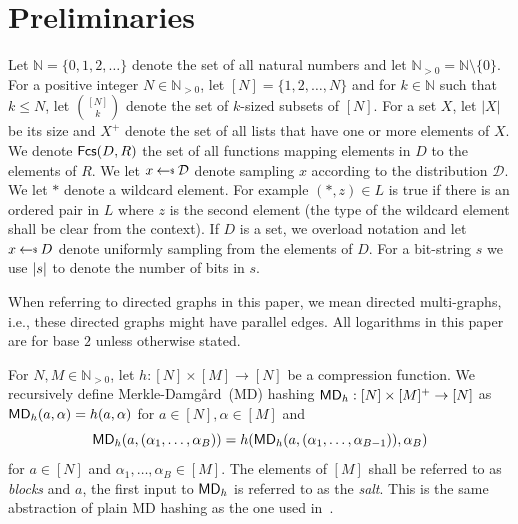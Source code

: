 \section{Preliminaries}\label{sec:prelims}
\ifnum{} Let $\mathbb{N}=\{0,1,2,\ldots\}$ denote the set of all natural numbers and let $\mathbb{N}_{>0}=\mathbb{N}\setminus\{0\}$. \fi
For \ifnum{} a positive integer \fi $N\in \mathbb{N}_{>0}$, let $[N]=\{1,2,\ldots,N\}$ and for $k\in \mathbb{N}$ such that $k\leq N$, let $\binom{[N]}{k}$ denote the set of $k$-sized subsets of $[N]$. For a set $X$, let $|X|$ be its size and $X^+$ denote the set of all lists that have one or more elements of $X$. We denote $\mathsf{Fcs}(D,R)$  the set of all functions mapping elements in $D$ to the elements of $R$.
%
We let $x\getsr\mathcal{D}$ denote sampling $x$ according to the distribution $\mathcal{D}$. We let $\ast$ denote a wildcard element. For example $(\ast,z)\in L$ is true if there is an ordered pair in $L$ where $z$ is the second element (the type of the wildcard element shall be clear from the context).
If $D$ is a set, we overload notation and let $x\getsr D$ denote uniformly sampling from the elements of $D$. For a bit-string $s$ we use $\left| s \right|$ to denote the number of bits in $s$.

When referring to directed graphs in this paper, we mean directed multi-graphs, i.e., these directed graphs might have parallel edges.
All logarithms in this paper are for base $2$ unless otherwise stated.

\ifnum{}
  For $N,M\in \mathbb{N}_{>0}$, let $h:[N]\times[M]\to [N]$ be a compression function. We recursively define Merkle-Damg\aa rd~(MD) hashing $\mathsf{MD}_h:[N]\times [M]^+\to [N]$ as $\mathsf{MD}_h(a,\alpha)=h(a,\alpha)$ for $a\in [N],\alpha\in [M]$ and \[\mathsf{MD}_h(a,(\alpha_1,\ldots,\alpha_B))=h(\mathsf{MD}_h(a,(\alpha_1,\ldots,\alpha_{B-1})),\alpha_B)\] for $a\in [N]$ and $\alpha_1,\ldots,\alpha_B\in [M]$. The elements of $[M]$ shall be referred to as \emph{blocks} and $a$, the first input to $\mathsf{MD}_h$ is referred to as the \emph{salt}. This is the same abstraction of plain MD hashing as the one used in~\cite{AkshimaCDW20}.
\fi

